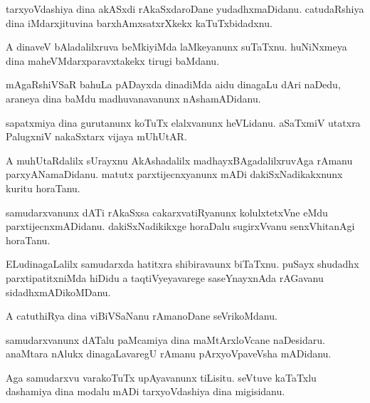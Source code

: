 \documentclass{article}
\begin{document}
\begin{mn}%
tarxyoVdashiya dina akASxdi rAkaSxdaroDane yudadhxmaDidanu. catudaRshiya dina iMdarxjituvina 
barxhAmxsatxrXkekx kaTuTxbidadxnu.
\end{mn}

\begin{mn}%
A dinaveV bAladalilxruva beMkiyiMda laMkeyanunx suTaTxnu. huNiNxmeya dina 
maheVMdarxparavxtakekx tirugi baMdanu.
\end{mn}

\begin{mn}%
mAgaRshiVSaR bahuLa pADayxda dinadiMda aidu dinagaLu dAri naDedu, araneya dina baMdu 
madhuvanavanunx nAshamADidanu.
\end{mn}

\begin{mn}%
sapatxmiya dina gurutanunx koTuTx elalxvanunx heVLidanu. aSaTxmiV utatxra PalugxniV 
nakaSxtarx vijaya mUhUtAR.
\end{mn}

\begin{mn}%
A muhUtaRdalilx sUrayxnu AkAshadalilx madhayxBAgadalilxruvAga rAmanu parxyANamaDidanu. 
matutx parxtijecnxyanunx mADi dakiSxNadikakxnunx kuritu horaTanu.
\end{mn}

\begin{mn}%
samudarxvanunx dATi rAkaSxsa cakarxvatiRyanunx kolulxtetxVne eMdu parxtijecnxmADidanu. 
dakiSxNadikikxge horaDalu sugirxVvanu senxVhitanAgi horaTanu.
\end{mn}

\begin{mn}%
ELudinagaLalilx samudarxda hatitxra shibiravaunx biTaTxnu. puSayx shudadhx 
parxtipatitxniMda hiDidu a taqtiVyeyavarege saseYnayxnAda rAGavanu sidadhxmADikoMDanu.
\end{mn}

\begin{mn}%
A catuthiRya dina viBiVSaNanu rAmanoDane seVrikoMdanu. 
\end{mn}

\begin{mn}%
samudarxvanunx dATalu paMcamiya dina maMtArxloVcane naDesidaru. anaMtara nAlukx 
dinagaLavaregU  rAmanu pArxyoVpaveVsha mADidanu.
\end{mn}

\begin{mn}%
Aga samudarxvu varakoTuTx upAyavanunx tiLisitu. seVtuve kaTaTxlu dashamiya dina modalu 
mADi tarxyoVdashiya dina migisidanu.
\end{mn}
\end{document}
